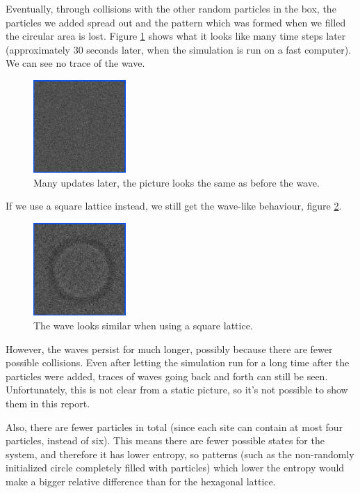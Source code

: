 \documentclass[12pt,a4paper]{article}
\begin{document}
Eventually, through collisions
with the other random particles in the box, the particles we added spread out and the pattern which was formed
when we filled the circular area is lost. Figure \ref{hexwaveend} shows what it looks like many time
steps later (approximately 30 seconds later, when the simulation is run on a fast computer).
We can see no trace of the wave.

\begin{figure}[htp]
\centering
  \includegraphics[width=100pt]{figs/hexwaveend.png}
\caption{Many updates later, the picture looks the same as before the wave.}
\label{hexwaveend}
\end{figure}



If we use a square lattice instead, we still get the wave-like behaviour, figure \ref{squarewave}.
\begin{figure}[htp]
\centering
  \includegraphics[width=100pt]{figs/squarewave.png}
\caption{The wave looks similar when using a square lattice.}
\label{squarewave}
\end{figure}

However, the waves persist for much longer, possibly because there are fewer possible collisions.
Even after letting the simulation run for a long time after the particles were added, traces of waves
going back and forth can still be seen. Unfortunately, this is not clear from a static picture, so
it's not possible to show them in this report.

Also, there are fewer particles in total (since each site can contain at most four particles, instead of six).
This means there are fewer possible states for the system, and therefore it has lower entropy, so patterns
(such as the non-randomly initialized circle completely filled with particles) which lower the entropy would make
a bigger relative difference than for the hexagonal lattice.
\end{document}
